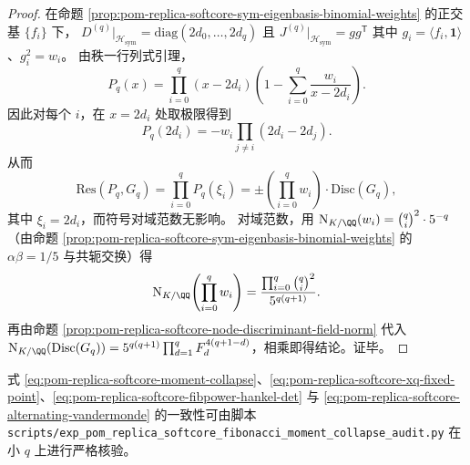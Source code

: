 \begin{proof}
在命题 \ref{prop:pom-replica-softcore-sym-eigenbasis-binomial-weights} 的正交基 \(\{f_i\}\) 下，
\(
D^{(q)}|_{\mathcal H_{\mathrm{sym}}}=\mathrm{diag}(2d_0,\dots,2d_q)
\) 且 \(J^{(q)}|_{\mathcal H_{\mathrm{sym}}}=gg^{\mathsf T}\) 其中 \(g_i=\langle f_i,\mathbf{1}\rangle\)、\(g_i^2=w_i\)。
由秩一行列式引理，
\[
P_q(x)=\prod_{i=0}^{q}(x-2d_i)\left(1-\sum_{i=0}^{q}\frac{w_i}{x-2d_i}\right).
\]
因此对每个 \(i\)，在 \(x=2d_i\) 处取极限得到
\[
P_q(2d_i)=-w_i\prod_{j\ne i}(2d_i-2d_j).
\]
从而
\[
\mathrm{Res}(P_q,G_q)
=\prod_{i=0}^{q}P_q(\xi_i)
=\pm\left(\prod_{i=0}^{q}w_i\right)\cdot \mathrm{Disc}(G_q),
\]
其中 \(\xi_i=2d_i\)，而符号对域范数无影响。
对域范数，用 \(\mathrm N_{K/\QQ}(w_i)=\binom{q}{i}^2\cdot 5^{-q}\)（由命题 \ref{prop:pom-replica-softcore-sym-eigenbasis-binomial-weights} 的 \(\alpha\beta=1/5\) 与共轭交换）得
\[
\mathrm N_{K/\QQ}\!\left(\prod_{i=0}^q w_i\right)
=\frac{\prod_{i=0}^q\binom{q}{i}^2}{5^{q(q+1)}}.
\]
再由命题 \ref{prop:pom-replica-softcore-node-discriminant-field-norm} 代入
\(
\mathrm N_{K/\QQ}(\mathrm{Disc}(G_q))=5^{q(q+1)}\prod_{d=1}^q F_d^{4(q+1-d)}
\)，相乘即得结论。证毕。
\end{proof}

\begin{remark}[审计脚本]\label{rem:pom-replica-softcore-fibonacci-moment-collapse-audit-script}
式 \eqref{eq:pom-replica-softcore-moment-collapse}、\eqref{eq:pom-replica-softcore-xq-fixed-point}、\eqref{eq:pom-replica-softcore-fibpower-hankel-det} 与 \eqref{eq:pom-replica-softcore-alternating-vandermonde} 的一致性可由脚本
\texttt{scripts/exp\_pom\_replica\_softcore\_fibonacci\_moment\_collapse\_audit.py}
在小 \(q\) 上进行严格核验。
\end{remark}

\endinput
